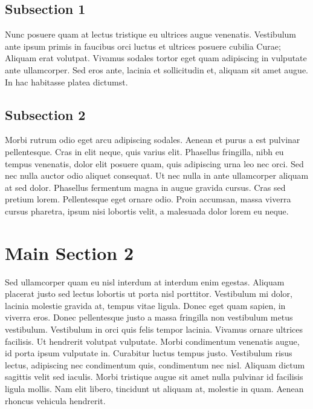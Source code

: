 \subsection{Subsection 1}

Nunc posuere quam at lectus tristique eu ultrices augue venenatis. Vestibulum ante ipsum primis in faucibus orci luctus et ultrices posuere cubilia Curae; Aliquam erat volutpat. Vivamus sodales tortor eget quam adipiscing in vulputate ante ullamcorper. Sed eros ante, lacinia et sollicitudin et, aliquam sit amet augue. In hac habitasse platea dictumst.


\subsection{Subsection 2}
Morbi rutrum odio eget arcu adipiscing sodales. Aenean et purus a est pulvinar pellentesque. Cras in elit neque, quis varius elit. Phasellus fringilla, nibh eu tempus venenatis, dolor elit posuere quam, quis adipiscing urna leo nec orci. Sed nec nulla auctor odio aliquet consequat. Ut nec nulla in ante ullamcorper aliquam at sed dolor. Phasellus fermentum magna in augue gravida cursus. Cras sed pretium lorem. Pellentesque eget ornare odio. Proin accumsan, massa viverra cursus pharetra, ipsum nisi lobortis velit, a malesuada dolor lorem eu neque.


\section{Main Section 2}

Sed ullamcorper quam eu nisl interdum at interdum enim egestas. Aliquam placerat justo sed lectus lobortis ut porta nisl porttitor. Vestibulum mi dolor, lacinia molestie gravida at, tempus vitae ligula. Donec eget quam sapien, in viverra eros. Donec pellentesque justo a massa fringilla non vestibulum metus vestibulum. Vestibulum in orci quis felis tempor lacinia. Vivamus ornare ultrices facilisis. Ut hendrerit volutpat vulputate. Morbi condimentum venenatis augue, id porta ipsum vulputate in. Curabitur luctus tempus justo. Vestibulum risus lectus, adipiscing nec condimentum quis, condimentum nec nisl. Aliquam dictum sagittis velit sed iaculis. Morbi tristique augue sit amet nulla pulvinar id facilisis ligula mollis. Nam elit libero, tincidunt ut aliquam at, molestie in quam. Aenean rhoncus vehicula hendrerit.